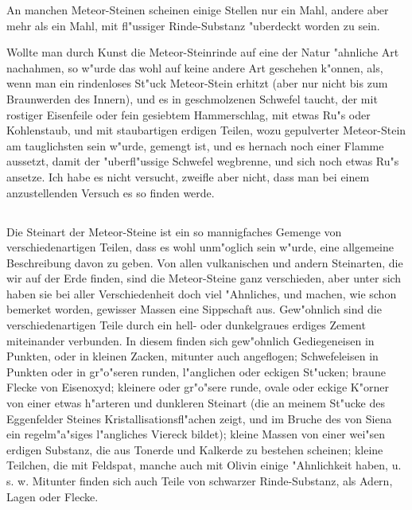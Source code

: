 \documentclass[a4paper, 11pt, oneside, polutonikogreek, german]{article}
\begin{document}
An manchen Meteor-Steinen scheinen einige Stellen nur ein Mahl, andere aber mehr als ein Mahl, mit fl"ussiger Rinde-Substanz "uberdeckt worden zu sein.

Wollte man durch Kunst die Meteor-Steinrinde auf eine der Natur "ahnliche Art nachahmen, so w"urde das wohl auf keine andere Art geschehen k"onnen, als, wenn man ein rindenloses St"uck Meteor-Stein erhitzt (aber nur nicht bis zum Braunwerden des Innern), und es in geschmolzenen Schwefel taucht, der mit rostiger Eisenfeile oder fein gesiebtem Hammerschlag, mit etwas Ru"s oder Kohlenstaub, und mit staubartigen erdigen Teilen, wozu gepulverter Meteor-Stein am tauglichsten sein w"urde, gemengt ist, und es hernach noch einer Flamme aussetzt, damit der "uberfl"ussige Schwefel wegbrenne, und sich noch etwas Ru"s ansetze. Ich habe es nicht versucht, zweifle aber nicht, dass man bei einem anzustellenden Versuch es so finden werde.
\subsection{}
\paragraph{}
Die Steinart der Meteor-Steine ist ein so mannigfaches Gemenge von verschiedenartigen Teilen, dass es wohl unm"oglich sein w"urde, eine allgemeine Beschreibung davon zu geben. Von allen vulkanischen und andern Steinarten, die wir auf der Erde finden, sind die Meteor-Steine ganz verschieden, aber unter sich haben sie bei aller Verschiedenheit doch viel "Ahnliches, und machen, wie schon bemerket worden, gewisser Massen eine Sippschaft aus. Gew"ohnlich sind die verschiedenartigen Teile durch ein hell- oder dunkelgraues erdiges Zement miteinander verbunden. In diesem finden sich gew"ohnlich Gediegeneisen in Punkten, oder in kleinen Zacken, mitunter auch angeflogen; Schwefeleisen in Punkten oder in gr"o"seren runden, l"anglichen oder eckigen St"ucken; braune Flecke von Eisenoxyd; kleinere oder gr"o"sere runde, ovale oder eckige K"orner von einer etwas h"arteren und dunkleren Steinart (die an meinem St"ucke des Eggenfelder Steines Kristallisationsfl"achen zeigt, und im Bruche des von Siena ein regelm"a"siges l"angliches Viereck bildet); kleine Massen von einer wei"sen erdigen Substanz, die aus Tonerde und Kalkerde zu bestehen scheinen; kleine Teilchen, die mit Feldspat, manche auch mit Olivin einige "Ahnlichkeit haben, u. s. w. Mitunter finden sich auch Teile von schwarzer Rinde-Substanz, als Adern, Lagen oder Flecke.
\end{document}
